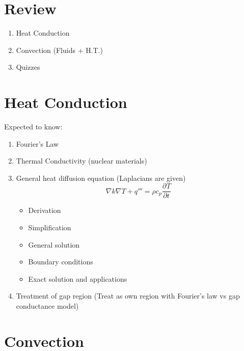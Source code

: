 \documentclass{article}
\begin{document}
\newcommand{\pd}[3]{\frac{\partial^{#3}#1}{\partial#2^{#3}}}

\section{Review}
\newcommand{\mass}{\pd{\rho}{t}{} + \nabla\cdot\rho\Vec{v} = 0}
\newcommand{\momentum}{\pd{\rho\Vec{v}}{t}{} + \nabla \cdot \rho\Vec{v}\Vec{v}=-\nabla P + \nabla \cdot \tau+\rho \Vec{g}}
\newcommand{\energy}{\pd{\rho u}{t}{} + \nabla\cdot\rho\Vec{v}u 
        =
        -\nabla\cdot q'' - P\nabla\cdot\Vec{v} + \tau\mathbf{:}\nabla\Vec{v}+q'''}

        
\begin{enumerate}
    \item Heat Conduction
    \item Convection (Fluids + H.T.)
    \item Quizzes
\end{enumerate}

\section{Heat Conduction}
Expected to know:
\begin{enumerate}
    \item Fourier's Law
    \item Thermal Conductivity (nuclear materials)
    \item General heat diffusion equation (Laplacians are given)
    \begin{equation}
        \nabla k \nabla T + q''' = \rho c_p \pd{T}{t}{}
    \end{equation}
    \begin{itemize}
        \item Derivation 
        \item Simplification
        \item General solution
        \item Boundary conditions
        \item Exact solution and applications
    \end{itemize}
    \item Treatment of gap region (Treat as own region with Fourier's law vs gap conductance model)
\end{enumerate}

\section{Convection}
\end{document}
